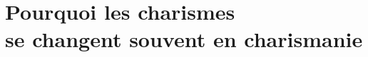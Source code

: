\chapter[Pourquoi les charismes se changent souvent en charismanie]{Pourquoi les charismes\\ se changent souvent en charismanie}
\renewcommand{\chaphead}{Pourquoi les charismes se changent souvent\dots{}}


\closechapter
